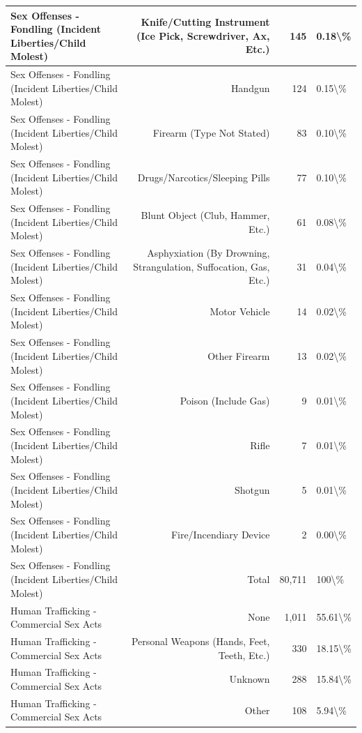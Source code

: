 \documentclass[
]{krantz}
\begin{document}
\begin{longtable}[t]{l|r|r|l}
\hline
Sex Offenses - Fondling (Incident Liberties/Child Molest) & Knife/Cutting Instrument (Ice Pick, Screwdriver, Ax, Etc.) & 145 & 0.18\textbackslash{}\%\\
\hline
Sex Offenses - Fondling (Incident Liberties/Child Molest) & Handgun & 124 & 0.15\textbackslash{}\%\\
\hline
Sex Offenses - Fondling (Incident Liberties/Child Molest) & Firearm (Type Not Stated) & 83 & 0.10\textbackslash{}\%\\
\hline
Sex Offenses - Fondling (Incident Liberties/Child Molest) & Drugs/Narcotics/Sleeping Pills & 77 & 0.10\textbackslash{}\%\\
\hline
Sex Offenses - Fondling (Incident Liberties/Child Molest) & Blunt Object (Club, Hammer, Etc.) & 61 & 0.08\textbackslash{}\%\\
\hline
Sex Offenses - Fondling (Incident Liberties/Child Molest) & Asphyxiation (By Drowning, Strangulation, Suffocation, Gas, Etc.) & 31 & 0.04\textbackslash{}\%\\
\hline
Sex Offenses - Fondling (Incident Liberties/Child Molest) & Motor Vehicle & 14 & 0.02\textbackslash{}\%\\
\hline
Sex Offenses - Fondling (Incident Liberties/Child Molest) & Other Firearm & 13 & 0.02\textbackslash{}\%\\
\hline
Sex Offenses - Fondling (Incident Liberties/Child Molest) & Poison (Include Gas) & 9 & 0.01\textbackslash{}\%\\
\hline
Sex Offenses - Fondling (Incident Liberties/Child Molest) & Rifle & 7 & 0.01\textbackslash{}\%\\
\hline
Sex Offenses - Fondling (Incident Liberties/Child Molest) & Shotgun & 5 & 0.01\textbackslash{}\%\\
\hline
Sex Offenses - Fondling (Incident Liberties/Child Molest) & Fire/Incendiary Device & 2 & 0.00\textbackslash{}\%\\
\hline
Sex Offenses - Fondling (Incident Liberties/Child Molest) & Total & 80,711 & 100\textbackslash{}\%\\
\hline
Human Trafficking - Commercial Sex Acts & None & 1,011 & 55.61\textbackslash{}\%\\
\hline
Human Trafficking - Commercial Sex Acts & Personal Weapons (Hands, Feet, Teeth, Etc.) & 330 & 18.15\textbackslash{}\%\\
\hline
Human Trafficking - Commercial Sex Acts & Unknown & 288 & 15.84\textbackslash{}\%\\
\hline
Human Trafficking - Commercial Sex Acts & Other & 108 & 5.94\textbackslash{}\%\\

\end{longtable}
\end{document}
